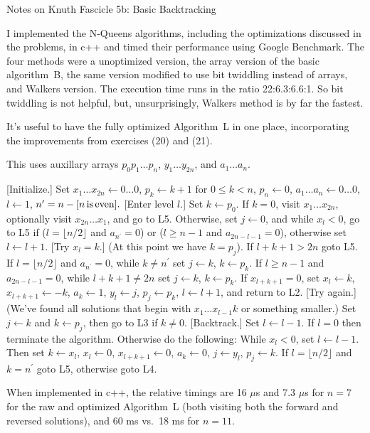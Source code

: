 \def\newstep#1{\smallskip \noindent {\bf #1}}
\def\newprob#1{\vskip 0.12in \noindent {\bf #1}}

\topglue 0.5in
\centerline{Notes on Knuth Fascicle 5b: Basic Backtracking}
\vskip 0.3in


I implemented the N-Queens algorithms, including the optimizations
discussed in the problems, in c++ and timed their performance using
Google Benchmark.  The four methods were a  unoptimized
version, the array version of the basic algorithm~B, the
same version modified to use bit twiddling instead of arrays,
and Walkers version.  The execution time runs in the ratio
22:6.3:6.6:1.  So bit twiddling is not helpful, but, unsurprisingly,
Walkers method is by far the fastest.

\vskip 0.1in

It's useful to have the fully optimized Algorithm~L in one place, incorporating
the improvements from exercises (20) and (21).

\noindent This uses auxillary arrays $p_0 p_1 \ldots p_n$, $y_1 \ldots y_{2n}$, and
$a_1 \ldots a_n$.

 [Initialize.] Set $x_1 \ldots x_{2 n} \leftarrow 0 \ldots 0$,
$p_k \leftarrow k + 1$ for $0 \leq k < n$, $p_n \leftarrow 0$, 
$a_{1} \ldots a_{n} \leftarrow 0 \ldots 0$, $l \leftarrow 1$,
$n^{\prime} = n - [n \rm{\, is\, even}].$
\vskip 0.05in
 [Enter level $l$.] Set $k \gets p_0$.  If $k = 0$, visit
$x_1 \ldots x_{2n}$, optionally visit $x_{2n} \ldots x_1$, and 
go to L5.  Otherwise, set $j \leftarrow 0$, and
while $x_l < 0$, go to L5 if ($l = \lfloor n / 2 \rfloor$ and $a_{n^{\prime}} = 0$) 
or ($l \ge n - 1$ and $a_{2n - l - 1} = 0$), otherwise
set $l \leftarrow l + 1$.
\vskip 0.05in
 [Try $x_l = k$.] (At this point we have $k = p_j$).  If $l + k + 1 > 2n$
goto L5.  If $l = \lfloor n / 2 \rfloor$ and $a_{n^{\prime}} = 0$, while $k \ne n^{\prime}$
set $j \leftarrow k$, $k \leftarrow p_k$.  If $l \ge n - 1$ and $a_{2n - l - 1} = 0$, 
while $l + k + 1 \ne 2 n $ set $j \leftarrow k$, $k \leftarrow p_k$.  If $x_{l + k + 1} = 0$, 
set $x_l \leftarrow k$, $x_{l + k + 1} \leftarrow -k$,
$a_k \leftarrow 1$, $y_l \leftarrow j$, $p_j \leftarrow p_k$, $l \leftarrow l + 1$, and return to L2.
\vskip 0.05in
 [Try again.] (We've found all solutions that begin with $x_1 \ldots x_{l-1} k$
or something smaller.) Set $j \leftarrow k$ and $k \leftarrow p_j$, then go to L3 if $k \ne 0$.
\vskip 0.05in
 [Backtrack.] Set $l \leftarrow l - 1$.   If $l = 0$ then terminate the algorithm.
Otherwise do the following: While $x_l < 0$, set $l \leftarrow l - 1$.  Then set 
$k \leftarrow x_l$, $x_l \leftarrow 0$, $x_{l + k + 1} \leftarrow 0$, $a_k \leftarrow 0$, 
$j \leftarrow y_l$, $p_j \leftarrow k$.  If $l = \lfloor n / 2 \rfloor$ and $k = n^{\prime}$
goto L5, otherwise goto L4.

When implemented in c++, the relative timings are 16 $\mu$s and 7.3 $\mu$s for $n = 7$ for the
raw and optimized Algorithm~L (both visiting both the forward and reversed solutions),
and 60 ms vs.\ 18 ms for $n = 11$.

\bye